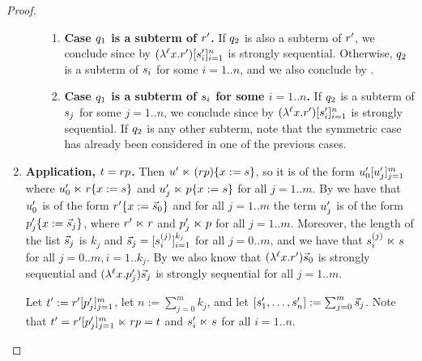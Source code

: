 \begin{proof}
\begin{enumerate}
\begin{enumerate}
\begin{enumerate}
    \item {\bf Case $q_1$ is a subterm of $r'$.}
      If $q_2$ is also a subterm of $r'$, we conclude since by \ih
      $(\lambda^{\ell} x. r')[s'_i]_{i=1}^{n}$ is strongly sequential.
      Otherwise, $q_2$ is a subterm of $s_i$ for some $i=1..n$,
      and we also conclude by \ih.
    \item {\bf Case $q_1$ is a subterm of $s_i$ for some $i=1..n$.}
      If $q_2$ is a subterm of $s_j$ for some $j=1..n$,
      we conclude since by \ih
      $(\lambda^{\ell} x. r')[s'_i]_{i=1}^{n}$ is strongly sequential.
      If $q_2$ is any other subterm, note that the symmetric case has already been considered
      in one of the previous cases.
    \end{enumerate}
  \end{enumerate}
\item {\bf Application, $t = rp$.}
  Then $u' \mathrel{\ltimes} (rp)\{x := s\}$,
  so it is of the form $u'_0[u'_j]_{j=1}^m$
  where $u'_0 \mathrel{\ltimes} r\{x := s\}$
  and $u'_j \mathrel{\ltimes} p\{x := s\}$ for all $j=1..m$.
  By \ih we have that $u'_0$ is of the form
  $r'\{x := \vec{s}_0\}$
  and for all $j=1..m$ the term $u'_j$ is of the form
  $p'_j\{x := \vec{s}_j\}$,
  where $r' \mathrel{\ltimes} r$
  and $p'_j \mathrel{\ltimes} p$ for all $j=1..m$.
  Moreover,
  the length of the list $\vec{s}_j$ is $k_j$
  and
  $\vec{s}_j = [s^{(j)}_i]_{i=1}^{k_j}$ for all $j=0..m$,
  and we have that $s^{(j)}_i \mathrel{\ltimes} s$ for all $j=0..m,i=1..k_j$.
  By \ih we also know that
  $(\lambda^{\ell} x. r')\vec{s}_0$ is strongly sequential
  and $(\lambda^{\ell} x. p'_j)\vec{s}_j$ is strongly sequential for all $j=1..m$.

  Let $t' := r'[p'_j]_{j=1}^{m}$,
  let $n := \sum_{j=0}^m k_j$,
  and let $[s'_1,\hdots,s'_n] := \sum_{j=0}^m \vec{s}_j$.
  Note that $t' = r'[p'_j]_{j=1}^{m} \mathrel{\ltimes} rp = t$
  and $s'_i \mathrel{\ltimes} s$ for all $i=1..n$.


\end{enumerate}
\end{proof}
